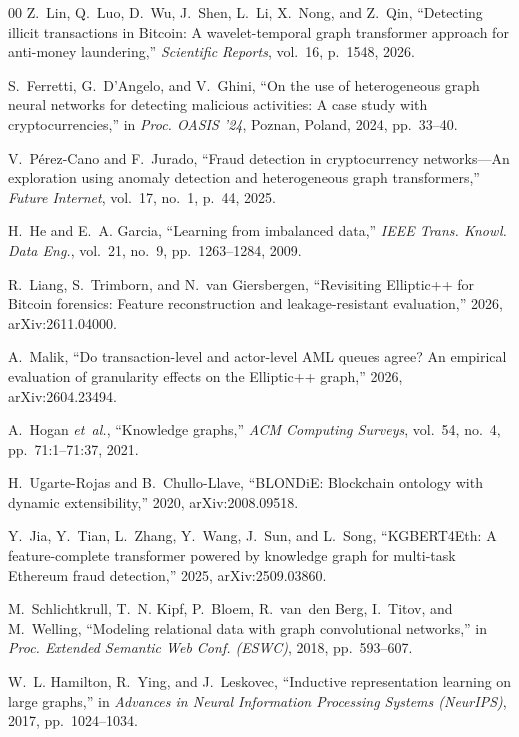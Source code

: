 \begin{thebibliography}{00}
 Z.~Lin, Q.~Luo, D.~Wu, J.~Shen, L.~Li, X.~Nong, and Z.~Qin, ``Detecting illicit transactions in Bitcoin: A wavelet-temporal graph transformer approach for anti-money laundering,'' \emph{Scientific Reports}, vol.~16, p.~1548, 2026.

 S.~Ferretti, G.~D'Angelo, and V.~Ghini, ``On the use of heterogeneous graph neural networks for detecting malicious activities: A case study with cryptocurrencies,'' in \emph{Proc. OASIS '24}, Poznan, Poland, 2024, pp.~33--40.

 V.~P{\'e}rez-Cano and F.~Jurado, ``Fraud detection in cryptocurrency networks---An exploration using anomaly detection and heterogeneous graph transformers,'' \emph{Future Internet}, vol.~17, no.~1, p.~44, 2025.

 H.~He and E.~A. Garcia, ``Learning from imbalanced data,'' \emph{IEEE Trans. Knowl. Data Eng.}, vol.~21, no.~9, pp.~1263--1284, 2009.

 R.~Liang, S.~Trimborn, and N.~van Giersbergen, ``Revisiting Elliptic++ for Bitcoin forensics: Feature reconstruction and leakage-resistant evaluation,'' 2026, arXiv:2611.04000.

 A.~Malik, ``Do transaction-level and actor-level AML queues agree? An empirical evaluation of granularity effects on the Elliptic++ graph,'' 2026, arXiv:2604.23494.

 A.~Hogan \emph{et~al.}, ``Knowledge graphs,'' \emph{ACM Computing Surveys}, vol.~54, no.~4, pp.~71:1--71:37, 2021.

 H.~Ugarte-Rojas and B.~Chullo-Llave, ``BLONDiE: Blockchain ontology with dynamic extensibility,'' 2020, arXiv:2008.09518.

 Y.~Jia, Y.~Tian, L.~Zhang, Y.~Wang, J.~Sun, and L.~Song, ``KGBERT4Eth: A feature-complete transformer powered by knowledge graph for multi-task Ethereum fraud detection,'' 2025, arXiv:2509.03860.

 M.~Schlichtkrull, T.~N. Kipf, P.~Bloem, R.~van~den Berg, I.~Titov, and M.~Welling, ``Modeling relational data with graph convolutional networks,'' in \emph{Proc. Extended Semantic Web Conf. (ESWC)}, 2018, pp.~593--607.

 W.~L. Hamilton, R.~Ying, and J.~Leskovec, ``Inductive representation learning on large graphs,'' in \emph{Advances in Neural Information Processing Systems (NeurIPS)}, 2017, pp.~1024--1034.


\end{thebibliography}
